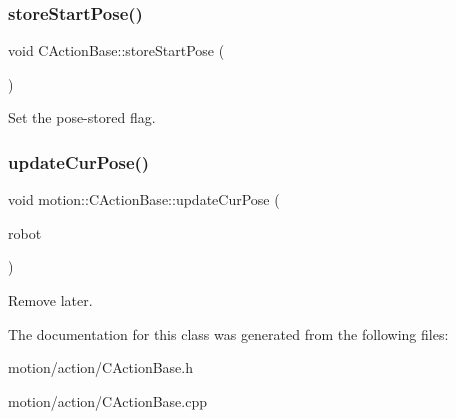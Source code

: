 \subsubsection{\texorpdfstring{store\+Start\+Pose()}{storeStartPose()}}
{\footnotesize\ttfamily void C\+Action\+Base\+::store\+Start\+Pose (\begin{DoxyParamCaption}\item[{void}]{ }\end{DoxyParamCaption})}

Set the pose-\/stored flag. \mbox{\label{classmotion_1_1CActionBase_aed9deac73a58d2f3272403140d927988}} 
\subsubsection{\texorpdfstring{update\+Cur\+Pose()}{updateCurPose()}}
{\footnotesize\ttfamily void motion\+::\+C\+Action\+Base\+::update\+Cur\+Pose (\begin{DoxyParamCaption}\item[{mrpt\+::kinematics\+::\+C\+Vehicle\+Simul\+\_\+\+Diff\+Driven $\ast$}]{robot }\end{DoxyParamCaption})\hspace{0.3cm}{\ttfamily [inline]}}

Remove later. 

The documentation for this class was generated from the following files\+:\begin{DoxyCompactItemize}
\item 
motion/action/C\+Action\+Base.\+h\item 
motion/action/C\+Action\+Base.\+cpp\end{DoxyCompactItemize}

